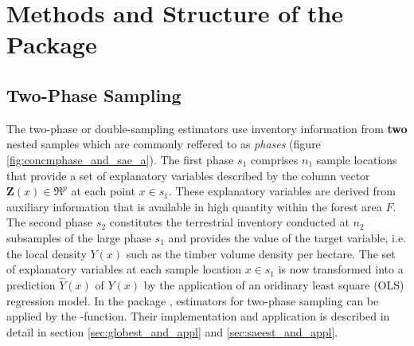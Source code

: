 \documentclass[article]{jss}
\begin{document}
%




\section{Methods and Structure of the Package}
\label{sec:str_and_mod}



\subsection{Two-Phase Sampling}

The two-phase or double-sampling estimators use inventory information from \textbf{two} nested samples which are commonly reffered to as \textit{phases} (figure \ref{fig:concmphase_and_sae_a}). The first phase $s_1$ comprises $n_1$ sample locations that provide a set of explanatory variables described by the column vector $\pmb{Z}(x)\in{\Re^{p}}$ at each point $x \in s_1$. These explanatory variables are derived from auxiliary information that is available in high quantity within the forest area $F$. The second phase $s_2$ constitutes the terrestrial inventory conducted at $n_2$ subsamples of the large phase $s_1$ and provides the value of the target variable, i.e. the local density $Y(x)$ such as the timber volume density per hectare. The set of explanatory variables at each sample location $x \in s_1$ is now transformed into a prediction $\hat{Y}(x)$ of $Y(x)$ by the application of an oridinary least square (OLS) regression model. In the  package , estimators for two-phase sampling can be applied by the -function. Their implementation and application is described in detail in section \ref{sec:globest_and_appl} and \ref{sec:saeest_and_appl}.
\end{document}
